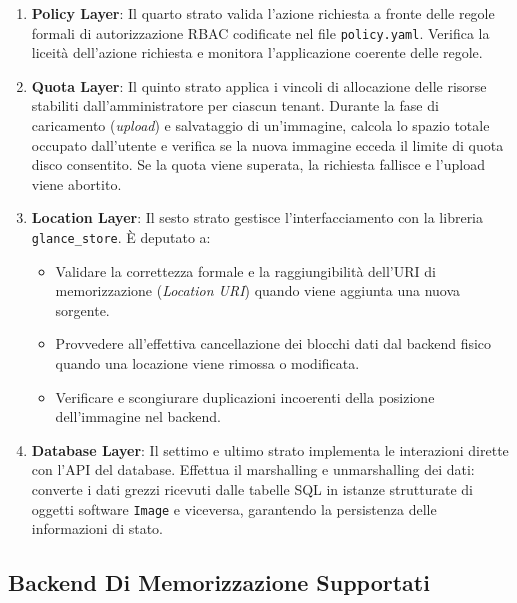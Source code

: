 \documentclass[11pt, a4paper]{article}
\begin{document}
\begin{enumerate}
    \item \textbf{Policy Layer}: Il quarto strato valida l'azione richiesta a fronte delle regole formali di autorizzazione RBAC codificate nel file \texttt{policy.yaml}. Verifica la liceità dell'azione richiesta e monitora l'applicazione coerente delle regole.

    \item \textbf{Quota Layer}: Il quinto strato applica i vincoli di allocazione delle risorse stabiliti dall'amministratore per ciascun tenant. Durante la fase di caricamento (\emph{upload}) e salvataggio di un'immagine, calcola lo spazio totale occupato dall'utente e verifica se la nuova immagine ecceda il limite di quota disco consentito. Se la quota viene superata, la richiesta fallisce e l'upload viene abortito.

    \item \textbf{Location Layer}: Il sesto strato gestisce l'interfacciamento con la libreria \texttt{glance\_store}. È deputato a:
    \begin{itemize}[noitemsep]
        \item Validare la correttezza formale e la raggiungibilità dell'URI di memorizzazione (\emph{Location URI}) quando viene aggiunta una nuova sorgente.
        \item Provvedere all'effettiva cancellazione dei blocchi dati dal backend fisico quando una locazione viene rimossa o modificata.
        \item Verificare e scongiurare duplicazioni incoerenti della posizione dell'immagine nel backend.
    \end{itemize}

    \item \textbf{Database Layer}: Il settimo e ultimo strato implementa le interazioni dirette con l'API del database. Effettua il marshalling e unmarshalling dei dati: converte i dati grezzi ricevuti dalle tabelle SQL in istanze strutturate di oggetti software \texttt{Image} e viceversa, garantendo la persistenza delle informazioni di stato.
\end{enumerate}

\subsection{Backend Di Memorizzazione Supportati}
\end{document}
